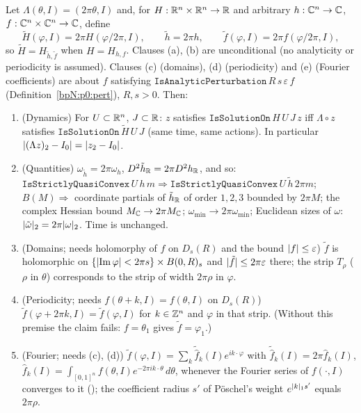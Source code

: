 \begin{lemma}\label{bpN:p1:period-convert}
Let $\Lambda(\theta,I)=(2\pi\theta,I)$ and, for $H:\mathbb{R}^n\times\mathbb{R}^n\to\mathbb{R}$ and arbitrary $h:\mathbb{C}^n\to\mathbb{C}$, $f:\mathbb{C}^n\times\mathbb{C}^n\to\mathbb{C}$, define
\[\tilde H(\varphi,I)=2\pi H(\varphi/2\pi,I),\qquad\tilde h=2\pi h,\qquad\tilde f(\varphi,I)=2\pi f(\varphi/2\pi,I),\]
so $\tilde H=H_{\tilde h,\tilde f}$ when $H=H_{h,f}$. Clauses (a), (b) are unconditional (no analyticity or periodicity is assumed). Clauses (c) (domains), (d) (periodicity) and (e) (Fourier coefficients) are about $f$ satisfying $\texttt{IsAnalyticPerturbation}\,R\,s\,\varepsilon\,f$ (Definition~\ref{bpN:p0:pert}), $R,s>0$. Then:
\begin{enumerate}[label=(\alph*)]
\item (Dynamics) For $U\subset\mathbb{R}^n$, $J\subset\mathbb{R}$: $z$ satisfies $\texttt{IsSolutionOn}\,H\,U\,J\,z$ iff $\Lambda\circ z$ satisfies $\texttt{IsSolutionOn}\,\tilde H\,U\,J$ (same time, same actions). In particular $\lvert (\Lambda z)_2-I_0\rvert=\lvert z_2-I_0\rvert$.
\item (Quantities) $\omega_{\tilde h}=2\pi\omega_h$, $D^2\tilde h_{\mathbb{R}}=2\pi D^2h_{\mathbb{R}}$, and so: $\texttt{IsStrictlyQuasiConvex}\,U\,h\,m\Rightarrow\texttt{IsStrictlyQuasiConvex}\,U\,\tilde h\,2\pi m$;
  $B(M)\Rightarrow$ coordinate partials of $\tilde h_{\mathbb{R}}$ of order $1,2,3$ bounded by $2\pi M$; the complex Hessian bound $M_{\mathbb{C}}\to2\pi M_{\mathbb{C}}$; $\omega_{\min}\to2\pi\omega_{\min}$; Euclidean sizes of $\omega$: $\lvert \tilde\omega\rvert_2=2\pi\lvert \omega\rvert_2$. Time is unchanged.
\item (Domains; needs holomorphy of $f$ on $D_s(R)$ and the bound $\lvert f\rvert\le\varepsilon$) $\tilde f$ is holomorphic on $\{\lvert \operatorname{Im}\varphi\rvert<2\pi s\}\times B(0,R)_s$ and $\lvert \tilde f\rvert\le2\pi\varepsilon$ there; the strip $T_\rho$ ($\rho$ in $\theta$) corresponds to the strip of width $2\pi\rho$ in $\varphi$.
\item (Periodicity; needs $f(\theta+k,I)=f(\theta,I)$ on $D_s(R)$) $\tilde f(\varphi+2\pi k,I)=\tilde f(\varphi,I)$ for $k\in\mathbb{Z}^n$ and $\varphi$ in that strip. (Without this premise the claim fails: $f=\theta_1$ gives $\tilde f=\varphi_1$.)
\item (Fourier; needs (c), (d)) $\tilde f(\varphi,I)=\sum_k\tilde{\hat f}_k(I)e^{ik\cdot\varphi}$ with $\tilde{\hat f}_k(I)=2\pi\hat f_k(I)$, $\hat f_k(I)=\int_{[0,1]^n}f(\theta,I)e^{-2\pi ik\cdot\theta}\,d\theta$, whenever the Fourier series of $f(\cdot,I)$ converges to it (); the coefficient radius $s'$ of P\"oschel's weight $e^{\lvert k\rvert_1s'}$ equals $2\pi\rho$.
\end{enumerate}
\end{lemma}
